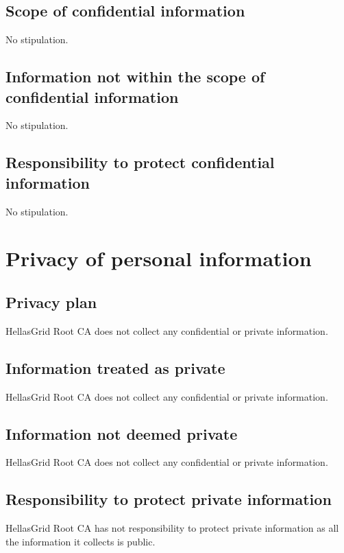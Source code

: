 \documentclass[11pt,a4paper,titlepage]{book}
\begin{document}
\subsection{Scope of confidential information}

No stipulation.

\subsection{Information not within the scope of confidential information}

No stipulation.

\subsection{Responsibility to protect confidential information}

No stipulation.

\section{Privacy of personal information}


\subsection{Privacy plan}

HellasGrid Root CA does not collect any confidential or private information.

\subsection{Information treated as private}

HellasGrid Root CA does not collect any confidential or private information.

\subsection{Information not deemed private}

HellasGrid Root CA does not collect any confidential or private information.



\subsection{Responsibility to protect private information}

HellasGrid Root CA has not responsibility to protect private information as all the information it collects is public.
\end{document}
